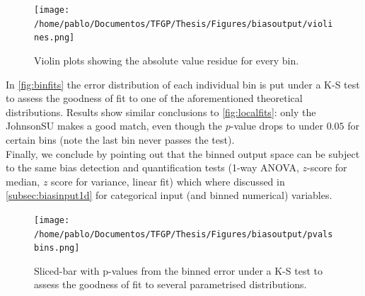 %
\begin{figure}[!htb]
	\centering
	\texttt{[image: /home/pablo/Documentos/TFGP/Thesis/Figures/biasoutput/violines.png]}
	\caption{Violin plots showing the absolute value residue for every bin.}
	\label{fig:violins}
\end{figure}
%
\indent In \autoref{fig:binfits} the error distribution of each individual bin is put under a K-S test to assess the goodness of fit to one of the aforementioned theoretical distributions. Results show similar conclusions to \autoref{fig:localfits}: only the JohnsonSU makes a good match, even though the $p$-value drops to under $0.05$ for certain bins (note the last bin never passes the test).\\
%
\indent Finally, we conclude by pointing out that the binned output space can be subject to the same bias detection and quantification tests (1-way ANOVA, $z$-score for median, $z$ score for variance, linear fit) which where discussed in \autoref{subsec:biasinput1d} for categorical input (and binned numerical) variables.\\

\begin{figure}[!htb]
	\centering
	\texttt{[image: /home/pablo/Documentos/TFGP/Thesis/Figures/biasoutput/pvalsbins.png]}
	\caption{Sliced-bar with p-values from the binned error under a K-S test to assess the goodness of fit to several parametrised distributions.}
	\label{fig:binfits}
\end{figure}

\clearpage
\mbox{}
\clearpage
